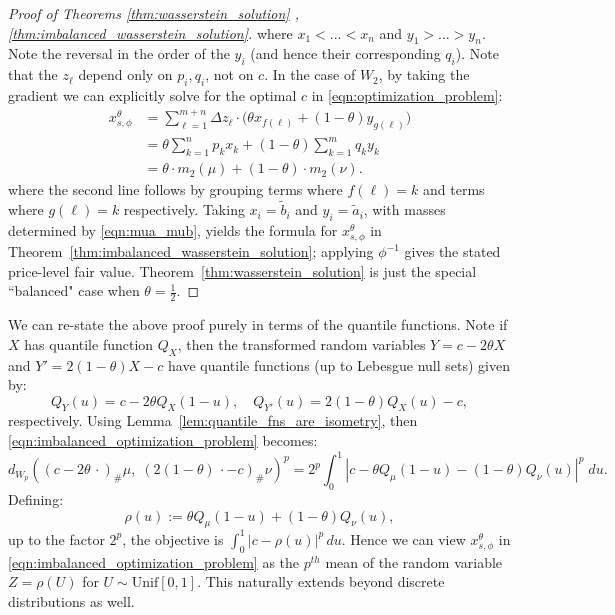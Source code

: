 \begin{proof}[Proof of Theorems \ref{thm:wasserstein_solution} ,\ref{thm:imbalanced_wasserstein_solution}]
\noindent where $x_1 < ... < x_n$ and $y_1 > ... > y_n$. Note the reversal in the order of the $y_i$ (and hence their corresponding $q_i$). Note that the $z_\ell$ depend only on $p_i, q_i$, not on $c$. In the case of $W_2$, by taking the gradient we can explicitly solve for the optimal $c$ in \eqref{eqn:optimization_problem}:
%
\begin{align*}
    x_{s,\phi}^\theta & = \sum_{\ell = 1}^{m+n} \Delta z_\ell \cdot \Big( \theta x_{f(\ell)} + (1-\theta)y_{g(\ell)} \Big) \\
    & =  \theta \sum_{k=1}^n p_k x_k +  (1-\theta)\sum_{k=1}^m q_ky_k \\
    & = \theta \cdot m_2(\mu) + (1-\theta) \cdot m_2(\nu).
\end{align*}
%
\noindent where the second line follows by grouping terms where $f(\ell) = k$ and
terms where $g(\ell) = k$ respectively. Taking $x_i=\widetilde b_i$ and $y_i=\widetilde a_i$, with masses determined by \eqref{eqn:mua_mub}, yields the formula for $x_{s,\phi}^\theta$ in Theorem~\ref{thm:imbalanced_wasserstein_solution}; applying $\phi^{-1}$ gives the stated price-level fair value.
Theorem~\ref{thm:wasserstein_solution} is just the special ``balanced" case when $\theta = \frac{1}{2}$.
\end{proof}

We can re-state the above proof purely in terms of the quantile functions. Note if $X$ has
quantile function $Q_X$, then the transformed random variables $Y = c-2\theta X$ and $Y' = 2(1-\theta)X - c$ have
quantile functions (up to Lebesgue null sets) given by:
%
    \[Q_Y(u) = c-2\theta Q_X(1-u), \quad Q_{Y'}(u) = 2(1-\theta) Q_X(u) - c,\]
%
\noindent respectively. Using Lemma~\ref{lem:quantile_fns_are_isometry}, then \eqref{eqn:imbalanced_optimization_problem} becomes:
%
\[d_{W_p}\left((c-2\theta\,\cdot)_\#\mu, \; (2(1-\theta)\,\cdot-c)_\#\nu\right)^p = 2^p \int_0^1 \left|c - \theta Q_\mu(1-u) - (1-\theta) Q_\nu(u)\right|^p \; du.\]
%
\noindent Defining:
%
\[\rho(u) := \theta Q_\mu(1-u) + (1-\theta) Q_\nu(u),\]
%
\noindent up to the factor $2^p$, the objective is $\int_0^1 |c-\rho(u)|^p\,du$. Hence we can
view $x_{s,\phi}^\theta$ in \eqref{eqn:imbalanced_optimization_problem} as the $p^{th}$ mean of the
random variable $Z = \rho(U)$ for $U \sim \mathrm{Unif}[0,1]$. This naturally extends
beyond discrete distributions as well.

